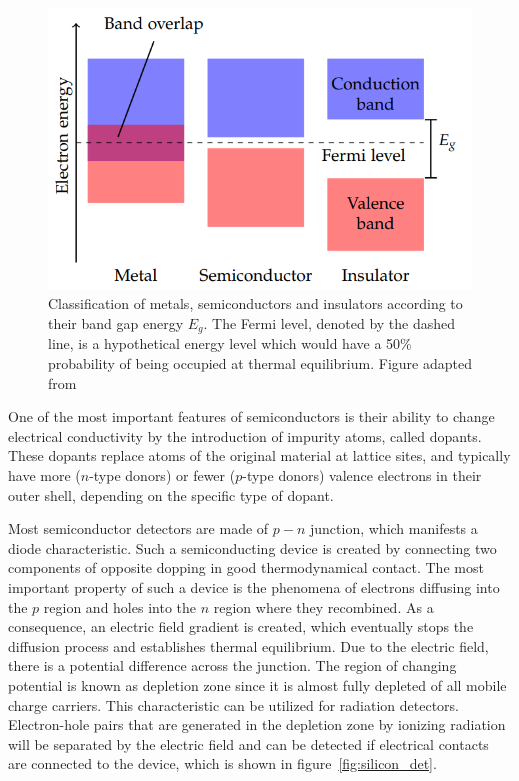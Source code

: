 \begin{figure}[h]
\centering
\includegraphics[scale=0.7]{figures/bound_gap.PNG}
\caption{Classification of metals, semiconductors and insulators according to their
band gap energy $E_g$. The Fermi level, denoted by the dashed line, is a hypothetical energy level which would have a 50\% probability of being occupied at thermal equilibrium.  Figure adapted from \cite{radiation_damage}}
\label{fig:boundgap}
\end{figure}

One of the most important features of semiconductors is their ability to change electrical conductivity by the introduction of impurity atoms, called dopants. These dopants replace atoms of the original material at lattice sites, and typically have more ($n$-type donors) or fewer ($p$-type donors) valence electrons in their outer shell, depending on the specific type of dopant. 


Most semiconductor detectors are made of $p-n$ junction, which manifests a diode characteristic. Such a semiconducting device is created by connecting two components of opposite dopping in good thermodynamical contact. The most important property of such a device is the phenomena of electrons diffusing into the $p$ region and holes into the $n$ region where they recombined. As a consequence, an electric field gradient is created, which eventually stops the diffusion process and establishes thermal equilibrium. Due to the electric field, there is a potential difference across the junction. The region of changing potential is known as depletion zone since it is almost fully depleted of all mobile charge carriers. This characteristic can be utilized for radiation detectors. Electron-hole pairs that are generated in the depletion zone by ionizing radiation will be separated by the electric field and can be detected if electrical contacts are connected to the device, which is shown in figure~\ref{fig:silicon_det}.

